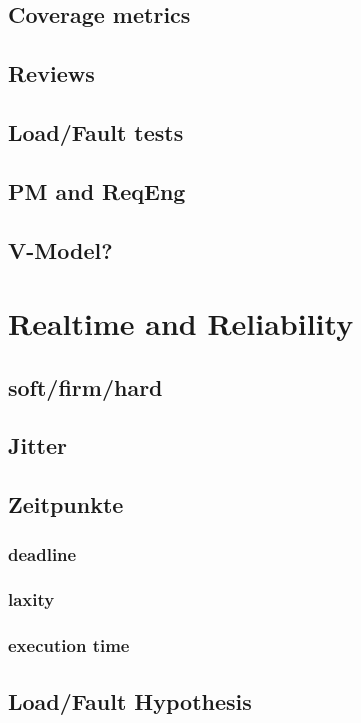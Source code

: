 	\subsection{Coverage metrics}
	
	\subsection{Reviews}
	
	\subsection{Load/Fault tests}
	
	\subsection{PM and ReqEng}
	
	\subsection{V-Model?}

	\section{Realtime and Reliability}
	\subsection{soft/firm/hard}
	\subsection{Jitter}
	\subsection{Zeitpunkte}
	\subsubsection{deadline}
	\subsubsection{laxity}
	\subsubsection{execution time}
	\subsection{Load/Fault Hypothesis}

